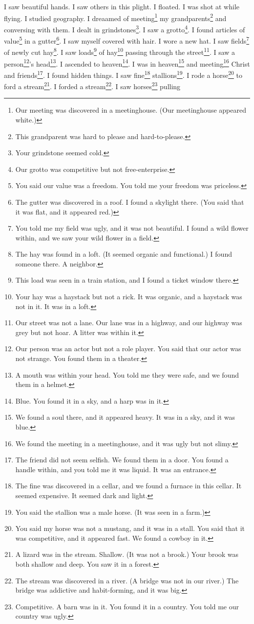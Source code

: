 \documentclass[12pt]{book}
\begin{document}
 I saw beautiful hands. I saw others in this plight. I floated. I was shot at while flying. I studied geography. I dreaamed of meeting\footnote{Our meeting was discovered in a meetinghouse. (Our meetinghouse appeared white.)} my grandparents\footnote{This grandparent was hard to please and hard-to-please.} and conversing with them. I dealt in grindstones\footnote{Your grindstone seemed cold.}. I saw a grotto\footnote{Our grotto was competitive but not free-enterprise.}. I found articles of value\footnote{You said our value was a freedom. You told me your freedom was priceless.} in a gutter\footnote{The gutter was discovered in a roof. I found a skylight there. (You said that it was flat, and it appeared red.)}. I saw myself covered with hair. I wore a new hat. I saw fields\footnote{You told me my field was ugly, and it was not beautiful. I found a wild flower within, and we saw your wild flower in a field.} of newly cut hay\footnote{The hay was found in a loft. (It seemed organic and functional.) I found someone there. A neighbor.}. I saw loads\footnote{This load was seen in a train station, and I found a ticket window there.} of hay\footnote{Your hay was a haystack but not a rick. It was organic, and a haystack was not in it. It was in a loft.} passing through the street\footnote{Our street was not a lane. Our lane was in a highway, and our highway was grey but not hoar. A litter was within it.}. I saw a person\footnote{Our person was an actor but not a role player. You said that our actor was not strange. You found them in a theater.}'s head\footnote{A mouth was within your head. You told me they were safe, and we found them in a helmet.}. I ascended to heaven\footnote{Blue. You found it in a sky, and a harp was in it.}. I was in heaven\footnote{We found a soul there, and it appeared heavy. It was in a sky, and it was blue.} and meeting\footnote{We found the meeting in a meetinghouse, and it was ugly but not slimy.} Christ and friends\footnote{The friend did not seem selfish. We found them in a door. You found a handle within, and you told me it was liquid. It was an entrance.}. I found hidden things. I saw fine\footnote{The fine was discovered in a cellar, and we found a furnace in this cellar. It seemed expensive. It seemed dark and light.} stallions\footnote{You said the stallion was a male horse. (It was seen in a farm.)}. I rode a horse\footnote{You said my horse was not a mustang, and it was in a stall. You said that it was competitive, and it appeared fast. We found a cowboy in it.} to ford a stream\footnote{A lizard was in the stream. Shallow. (It was not a brook.) Your brook was both shallow and deep. You saw it in a forest.}. I forded a stream\footnote{The stream was discovered in a river. (A bridge was not in our river.) The bridge was addictive and habit-forming, and it was big.}. I saw horses\footnote{Competitive. A barn was in it. You found it in a country. You told me our country was ugly.} pulling 
\end{document}
